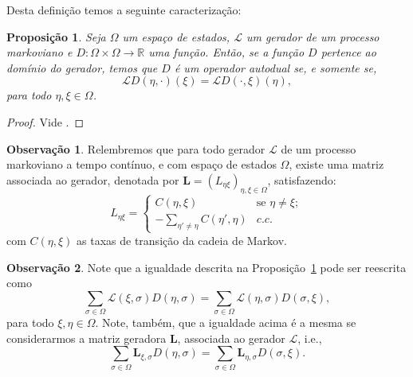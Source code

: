 \documentclass[twoside,openright,titlepage,numbers=noenddot,headinclude,  lineheaders footinclude=true,cleardoublepage=empty,
                                BCOR=5mm,paper=a4,fontsize=12pt ]{scrbook}
\newtheorem{prop}[teo]{Proposição}
\theoremstyle{definition}
\newtheorem*{obs*}{Observação}
\begin{document}
Desta definição temos a seguinte caracterização:
\begin{prop}\label{prop:dual}
Seja $\Omega$ um espaço de estados, $\mathscr{L}$ um gerador
de um processo markoviano e $D: \Omega \times \Omega \rightarrow \mathbb{R}$ uma função. Então,
se a função $D$ pertence ao domínio do gerador, temos que $D$ é um operador autodual 
se, e somente se,
\[
\mathscr{L}D(\eta, \cdot)(\xi) = \mathscr{L}D(\cdot, \xi)(\eta),
\]
para todo $\eta, \xi \in \Omega$. 
\end{prop}
\begin{proof}
Vide \cite{daniela}.
\end{proof}

\begin{obs*}
Relembremos que para todo gerador $\mathscr{L}$ de um processo markoviano a tempo contínuo, e com 
espaço de estados $\Omega$, existe
uma matriz associada ao gerador, denotada por $\bm{L} = (L_{\eta \xi})_{\eta, \xi \in \Omega}$, satisfazendo:
\[
L_{\eta \xi} = 
\begin{cases}
C(\eta, \xi) & \text{se } \eta \neq \xi;\\
-\sum_{\eta' \neq \eta} C(\eta', \eta) & c.c.
\end{cases}
\]
com $C(\eta, \xi)$ as taxas de transição da cadeia de Markov.
\end{obs*}

\begin{obs*}
Note que a igualdade descrita na Proposição~\ref{prop:dual} pode ser reescrita como
\[
\sum_{\sigma \in \Omega} \mathscr{L}(\xi, \sigma) D(\eta, \sigma)=
\sum_{\sigma \in \Omega} \mathscr{L}(\eta, \sigma) D(\sigma, \xi),
\]
para todo $\xi, \eta \in \Omega$. Note, também, que a igualdade acima é a mesma 
se considerarmos a matriz geradora $\bm{L}$, associada ao gerador $\mathscr{L}$, i.e.,
\[
\sum_{\sigma \in \Omega} \bm{L}_{\xi, \sigma} D(\eta, \sigma)=
\sum_{\sigma \in \Omega} \bm{L}_{\eta, \sigma} D(\sigma, \xi).
\]
\end{obs*}
\end{document}
